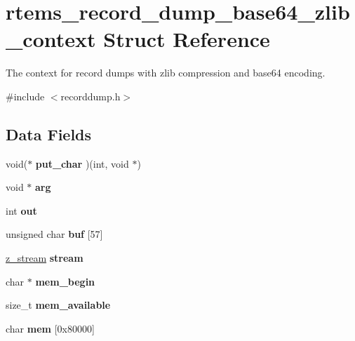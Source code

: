 \hypertarget{structrtems__record__dump__base64__zlib__context}{}\section{rtems\+\_\+record\+\_\+dump\+\_\+base64\+\_\+zlib\+\_\+context Struct Reference}
\label{structrtems__record__dump__base64__zlib__context}


The context for record dumps with zlib compression and base64 encoding.  




{\ttfamily \#include $<$recorddump.\+h$>$}

\subsection*{Data Fields}
\begin{DoxyCompactItemize}
\item 
\mbox{\label{structrtems__record__dump__base64__zlib__context_a85a4ba9978eabf0633b58d054ec5156a}} 
void($\ast$ {\bfseries put\+\_\+char} )(int, void $\ast$)
\item 
\mbox{\label{structrtems__record__dump__base64__zlib__context_ac4cd38c96f5fda45ebee5d8b652076fc}} 
void $\ast$ {\bfseries arg}
\item 
\mbox{\label{structrtems__record__dump__base64__zlib__context_ac5de738c514faca4c08260a13c13dfc6}} 
int {\bfseries out}
\item 
\mbox{\label{structrtems__record__dump__base64__zlib__context_a7c2bc515c0e984a08b7854b363af2e41}} 
unsigned char {\bfseries buf} \mbox{[}57\mbox{]}
\item 
\mbox{\label{structrtems__record__dump__base64__zlib__context_abb92697a7d7547d7957a07ebb60d645c}} 
\mbox{\hyperlink{structz__stream__s}{z\+\_\+stream}} {\bfseries stream}
\item 
\mbox{\label{structrtems__record__dump__base64__zlib__context_af5a7ed516fecd0271aa96fa401d8a607}} 
char $\ast$ {\bfseries mem\+\_\+begin}
\item 
\mbox{\label{structrtems__record__dump__base64__zlib__context_ae0ab7d8a62b51652e8cef575c8ed44fa}} 
size\+\_\+t {\bfseries mem\+\_\+available}
\item 
\mbox{\label{structrtems__record__dump__base64__zlib__context_a6738e4a273ca7c6a3d0bdab30285f8ba}} 
char {\bfseries mem} \mbox{[}0x80000\mbox{]}
\end{DoxyCompactItemize}


